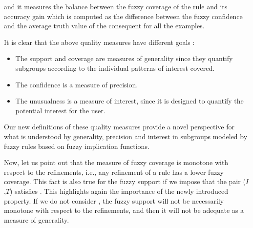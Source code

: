 \begin{itemize}
\begin{definition}
$$		$$
		and it measures the balance between the fuzzy coverage of the rule and its accuracy gain which is computed as the difference between the fuzzy confidence and the average truth value of the consequent for all the examples.
	\end{definition}
\end{itemize}
It is clear that the above quality measures have different goals \cite{Herrera2011}:
\begin{itemize}
	\item The support and coverage are measures of generality since they quantify subgroups according to the individual patterns of interest covered.
	\item The confidence is a measure of precision.
	\item The unusualness is a measure of interest, since it is designed to quantify the potential interest for the user.
\end{itemize}

Our new definitions of these quality measures provide a novel perspective for what is understood by generality, precision and interest in subgroups modeled by fuzzy rules based on fuzzy implication functions.

Now, let us point out that the measure of fuzzy coverage is monotone with respect to the refinements, i.e., any refinement of a rule has a lower fuzzy coverage. This fact is also true for the fuzzy support if we impose that the pair ($I$,$T$) satisfies \MTC. This highlights again the importance of the newly introduced property. If we do not consider \MTC, the fuzzy support will not be necessarily monotone with respect to the refinements, and then it will not be adequate as a measure of generality.

